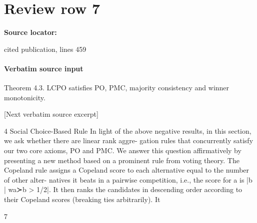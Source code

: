 \documentclass[10pt]{article}
\begin{document}
\section*{Review row 7}
\textbf{Source locator:} {\footnotesize\raggedright cited publication, lines 459\par}
\paragraph{Verbatim source input}
\begin{ReviewVerbatim}
Theorem 4.3. LCPO satisfies PO, PMC, majority consistency and winner monotonicity.

[Next verbatim source excerpt]

4     Social Choice-Based Rule
In light of the above negative results, in this section, we ask whether there are linear rank aggre-
gation rules that concurrently satisfy our two core axioms, PO and PMC. We answer this question
affirmatively by presenting a new method based on a prominent rule from voting theory.
The Copeland rule assigns a Copeland score to each alternative equal to the number of other alter-
natives it beats in a pairwise competition, i.e., the score for a is |{b | wa≻b > 1/2}|. It then ranks
the candidates in descending order according to their Copeland scores (breaking ties arbitrarily). It


                                                     7


\end{ReviewVerbatim}
\end{document}
